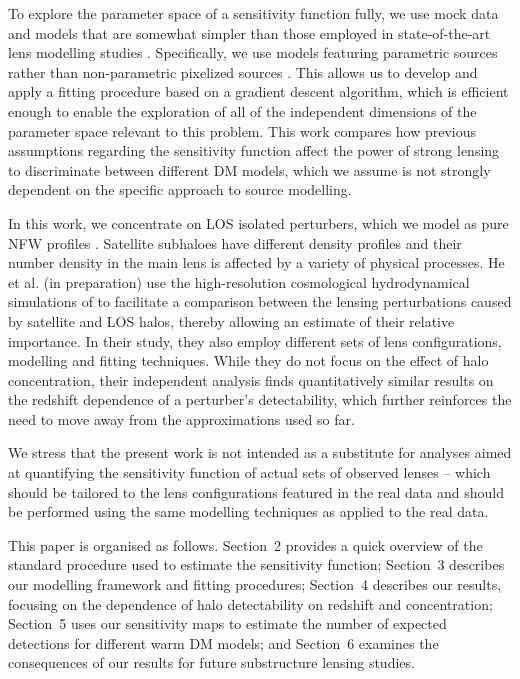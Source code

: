 \documentclass[a4paper, fleqn, usenatbib, useAMS]{mnras}
\begin{document}
To explore the parameter space of a sensitivity function fully, we use mock data and models that are somewhat simpler 
than those employed in state-of-the-art lens modelling studies \citep[e.g.][]{Vegetti2009, Nightingale2019, Powell2020}. 
Specifically, we use models featuring parametric sources rather than non-parametric pixelized sources 
\citep[e.g.][]{Warren2003, Dye2005,  Birrer2015a, Nightingale2015}. This allows us to develop and apply a 
fitting procedure based on a gradient descent algorithm, which is efficient enough to enable the exploration
of all of the independent dimensions of the parameter space relevant to this problem. This work compares how 
previous assumptions regarding the sensitivity function affect the
power of strong lensing to discriminate between different 
DM models, which we assume is not strongly dependent on the specific approach to source modelling.

In this work, we concentrate on LOS isolated perturbers, which we
model as pure NFW profiles \citep{Navarro1997}. Satellite subhaloes have different density profiles and their number
density in the main lens is affected by a variety of physical
processes. He et al. (in preparation) use the high-resolution
cosmological hydrodynamical simulations of \cite{Richings2021} to
facilitate a comparison between the lensing perturbations caused by
satellite and LOS halos, thereby allowing an estimate of their
relative importance. In their study, they also employ different sets of lens configurations, modelling and fitting techniques. While they do not focus on the effect of halo concentration, their independent analysis finds quantitatively similar results on the redshift dependence of a perturber's detectability, which further reinforces the need to move away from the approximations used so far. 

We stress that the present work is not intended as a substitute for
analyses aimed at quantifying the sensitivity function of actual sets
of observed lenses -- which should be tailored to the lens
configurations featured in the real data and should be performed using
the same modelling techniques as applied to the real data.

This paper is organised as follows.
Section~2 provides a quick overview of the standard procedure used to estimate the sensitivity function;
Section~3 describes our modelling framework and fitting procedures;
Section~4 describes our results, focusing on the dependence of halo detectability on redshift and concentration;
Section~5 uses our sensitivity maps to estimate the number of expected
detections for different warm DM models; and 
Section~6 examines the consequences of our results for future substructure lensing studies.
\end{document}
